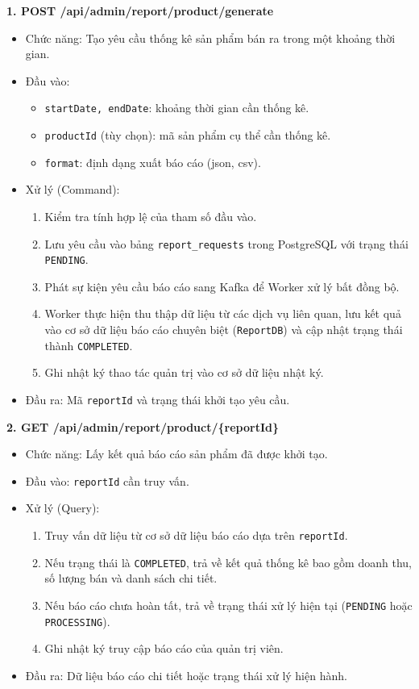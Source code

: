 \textbf{1. POST /api/admin/report/product/generate}
\begin{itemize}
    \item Chức năng: Tạo yêu cầu thống kê sản phẩm bán ra trong một khoảng thời gian.
    \item Đầu vào:
    \begin{itemize}
        \item \texttt{startDate, endDate}: khoảng thời gian cần thống kê.
        \item \texttt{productId} (tùy chọn): mã sản phẩm cụ thể cần thống kê.
        \item \texttt{format}: định dạng xuất báo cáo (json, csv).
    \end{itemize}
    \item Xử lý (Command):
    \begin{enumerate}
        \item Kiểm tra tính hợp lệ của tham số đầu vào.
        \item Lưu yêu cầu vào bảng \texttt{report\_requests} trong PostgreSQL với trạng thái \texttt{PENDING}.
        \item Phát sự kiện yêu cầu báo cáo sang Kafka để Worker xử lý bất đồng bộ.
        \item Worker thực hiện thu thập dữ liệu từ các dịch vụ liên quan, lưu kết quả vào cơ sở dữ liệu báo cáo chuyên biệt (\texttt{ReportDB}) và cập nhật trạng thái thành \texttt{COMPLETED}.
        \item Ghi nhật ký thao tác quản trị vào cơ sở dữ liệu nhật ký.
    \end{enumerate}
    \item Đầu ra: Mã \texttt{reportId} và trạng thái khởi tạo yêu cầu.
\end{itemize}

\textbf{2. GET /api/admin/report/product/\{reportId\}}
\begin{itemize}
    \item Chức năng: Lấy kết quả báo cáo sản phẩm đã được khởi tạo.
    \item Đầu vào: \texttt{reportId} cần truy vấn.
    \item Xử lý (Query):
    \begin{enumerate}
        \item Truy vấn dữ liệu từ cơ sở dữ liệu báo cáo dựa trên \texttt{reportId}.
        \item Nếu trạng thái là \texttt{COMPLETED}, trả về kết quả thống kê bao gồm doanh thu, số lượng bán và danh sách chi tiết.
        \item Nếu báo cáo chưa hoàn tất, trả về trạng thái xử lý hiện tại (\texttt{PENDING} hoặc \texttt{PROCESSING}).
        \item Ghi nhật ký truy cập báo cáo của quản trị viên.
    \end{enumerate}
    \item Đầu ra: Dữ liệu báo cáo chi tiết hoặc trạng thái xử lý hiện hành.
\end{itemize}

